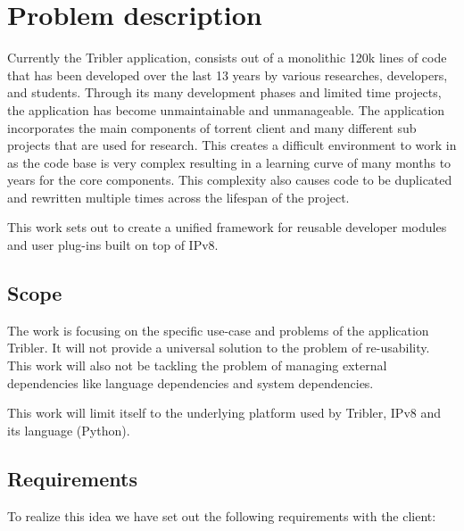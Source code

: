 \chapter{Problem description}


Currently the Tribler application, consists out of a monolithic 120k lines of code that has been developed over the last 13 years by various researches, developers, and students. Through its many development phases and limited time projects, the application has become unmaintainable and unmanageable. The application incorporates the main components of torrent client and many different sub projects that are used for research. This creates a difficult environment to work in as the code base is very complex resulting in a learning curve of many months to years for the core components. This complexity also causes code to be duplicated and rewritten multiple times across the lifespan of the project.

This work sets out to create a unified framework for reusable developer modules and user plug-ins built on top of IPv8.

\section{Scope}
The work is focusing on the specific use-case and problems of the application Tribler. It will not provide a universal solution to the problem of re-usability. This work will also not be tackling the problem of managing external dependencies like language dependencies and system dependencies.

This work will limit itself to the underlying platform used by Tribler, IPv8 and its language (Python).

\section{Requirements}
To realize this idea we have set out the following requirements with the client:

